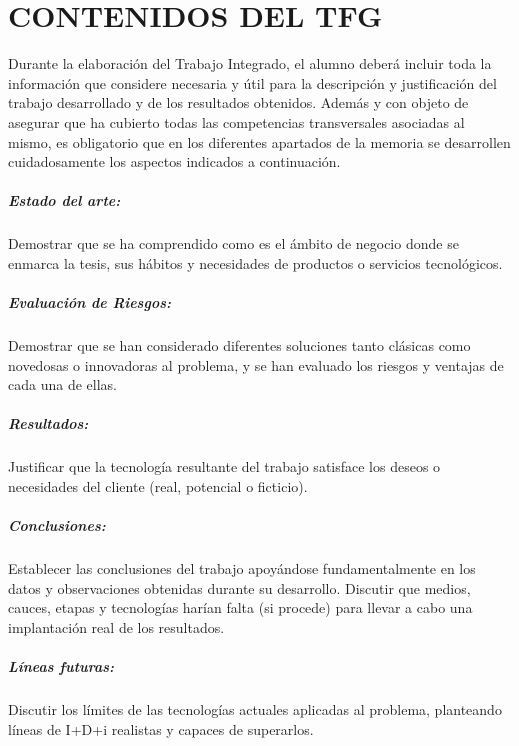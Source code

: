\chapter{CONTENIDOS DEL TFG}
\thispagestyle{empty}

Durante la elaboración del Trabajo Integrado, el alumno deberá incluir toda la información que considere necesaria y útil para la descripción y justificación del trabajo desarrollado y de los resultados obtenidos. Además y con objeto de asegurar que ha cubierto todas las competencias transversales asociadas al mismo, es obligatorio que en los diferentes apartados de la memoria se desarrollen cuidadosamente los aspectos indicados a continuación.

\paragraph{Estado del arte:}
Demostrar que se ha comprendido como es el ámbito de negocio donde se enmarca la tesis, sus hábitos y necesidades de productos o servicios tecnológicos.

\paragraph{Evaluación de Riesgos:}
Demostrar que se han considerado diferentes soluciones tanto clásicas como novedosas o innovadoras al problema, y se han evaluado los riesgos y ventajas de cada una de ellas.

\paragraph{Resultados:}
Justificar que la tecnología resultante del trabajo satisface los deseos o necesidades del cliente (real, potencial o ficticio).

\paragraph{Conclusiones:}
Establecer las conclusiones del trabajo apoyándose fundamentalmente en los datos y observaciones obtenidas durante su desarrollo.
Discutir que medios, cauces, etapas y tecnologías harían falta (si procede) para llevar a cabo una implantación real de los resultados.

\paragraph{Líneas futuras:}
Discutir los límites de las tecnologías actuales aplicadas al problema, planteando líneas de I+D+i realistas y capaces de superarlos.